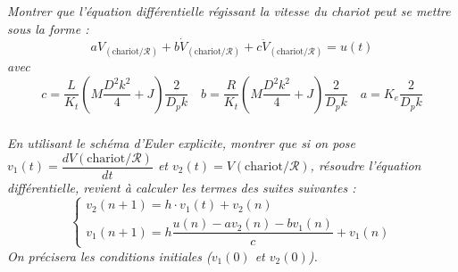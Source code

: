 \documentclass[10pt]{article}
\begin{document}
\subparagraph{}
\textit{Montrer que l'équation différentielle régissant la vitesse du chariot peut se mettre sous la forme :
$$
a V_{\left(\text{chariot}/\mathcal{R}\right)}
+ b \dot{V}_{\left(\text{chariot}/\mathcal{R}\right)}
+ c \ddot{V}_{\left(\text{chariot}/\mathcal{R}\right)}  = u(t)
$$
avec
$$c =    \dfrac{L}{K_t}\left( M  \dfrac{D^2 k^2}{4}  + J\right)\dfrac{2}{D_p k} 
\quad
b =  \dfrac{R}{K_t}\left( M  \dfrac{D^2 k^2}{4}   + J\right)\dfrac{2}{D_p k}   
\quad 
a= K_e\dfrac{2}{D_p k}$$
}


\subparagraph{}
\textit{En utilisant le schéma d'Euler explicite, montrer que si on pose $v_1(t) =\dfrac{d{V}\left(\text{chariot}/\mathcal{R}\right)}{dt}$ et $v_2(t) ={V}\left(\text{chariot}/\mathcal{R}\right)$, 
résoudre l'équation différentielle, revient à calculer les termes des suites suivantes : 
$$
\left\{
\begin{array}{l}
v_2(n+1)= h \cdot v_1(t) + v_2(n)\\
v_1(n+1) =  h\dfrac{u(n) - a v_2(n)- b v_1(n)}{c} + v_1(n)
\end{array}
\right.
$$
On précisera les conditions initiales ($v_1(0)$ et $v_2(0)$).}
\end{document}
